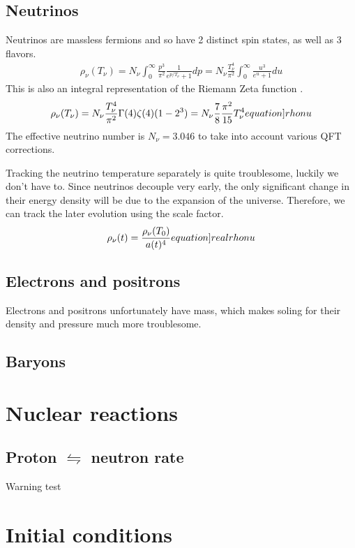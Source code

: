 \subsection{Neutrinos}

Neutrinos are massless fermions and so have 2 distinct spin states, as well as 3 flavors.
\begin{align}
    \rho_\nu(T_\nu)=N_\nu\int_{0}^{\infty} \frac{p^3}{\pi^2}\frac{1}{e^{p/T_\nu}+1}dp =  N_\nu\frac{T_\nu^4}{\pi^2}\int_{0}^{\infty}\frac{u^3}{e^{u}+1}du
\end{align}
This is also an integral representation of the Riemann Zeta function \cite[\href{https://dlmf.nist.gov/25.5.E3}{(25.5.3)}]{NIST:DLMF}.
\begin{align}
    \rho_\nu(T_\nu)=N_\nu\frac{T_\nu^4}{\pi^2}\Gamma(4)\zeta(4)(1-2^3)=N_\nu\frac{7}{8}\frac{\pi^2}{15}T_\nu^4
    \label[equation]{rhonu}
\end{align}
The effective neutrino number is $N_\nu=3.046$ to take into account various QFT corrections\cite{Mangano_2005}.

Tracking the neutrino temperature separately is quite troublesome, luckily we don't have to. Since neutrinos decouple very early, the only significant change in their energy density will be due to the expansion of the universe. Therefore, we can track the later evolution using the scale factor.
\begin{align}
    \rho_\nu(t)=\frac{\rho_\nu(T_0)}{a(t)^4}
    \label[equation]{realrhonu}
\end{align}



\subsection{Electrons and positrons}
Electrons and positrons unfortunately have mass, which makes soling for their density and pressure much more troublesome.







\subsection{Baryons}

\lipsum




\section{Nuclear reactions}
\label{sec:nucleartheory}

\subsection{Proton $\leftrightharpoons$ neutron rate}




Warning test

\lipsum

\section{Initial conditions}